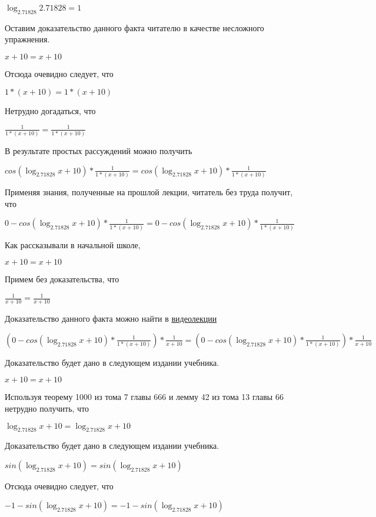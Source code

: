 \documentclass[12pt,a4paper,fleqn]{article}
\theoremstyle{definition}
\begin{document}
$\log_{ 2.71828 }{ 2.71828 } =  1 $

Оставим доказательство данного факта читателю в качестве несложного упражнения. 

$ x  +  10  =  x  +  10 $

Отсюда очевидно следует, что 

$ 1  * ( x  +  10 ) =  1  * ( x  +  10 )$

Нетрудно догадаться, что 

$\frac{ 1 }{ 1  * ( x  +  10 )}
 = \frac{ 1 }{ 1  * ( x  +  10 )}
$

В результате простых рассуждений можно получить 

$cos(\log_{ 2.71828 }{ x  +  10 }) * \frac{ 1 }{ 1  * ( x  +  10 )}
 = cos(\log_{ 2.71828 }{ x  +  10 }) * \frac{ 1 }{ 1  * ( x  +  10 )}
$

Применяя знания, полученные на прошлой лекции, читатель без труда получит, что 

$ 0  - cos(\log_{ 2.71828 }{ x  +  10 }) * \frac{ 1 }{ 1  * ( x  +  10 )}
 =  0  - cos(\log_{ 2.71828 }{ x  +  10 }) * \frac{ 1 }{ 1  * ( x  +  10 )}
$

Как рассказывали в начальной школе, 

$ x  +  10  =  x  +  10 $

Примем без доказательства, что 

$\frac{ 1 }{ x  +  10 }
 = \frac{ 1 }{ x  +  10 }
$

Доказательство данного факта можно найти в \href{https://www.youtube.com/watch?v=dQw4w9WgXcQ}{видеолекции} 

$( 0  - cos(\log_{ 2.71828 }{ x  +  10 }) * \frac{ 1 }{ 1  * ( x  +  10 )}
) * \frac{ 1 }{ x  +  10 }
 = ( 0  - cos(\log_{ 2.71828 }{ x  +  10 }) * \frac{ 1 }{ 1  * ( x  +  10 )}
) * \frac{ 1 }{ x  +  10 }
$

Доказательство будет дано в следующем издании учебника. 

$ x  +  10  =  x  +  10 $

Используя теорему 1000 из тома 7 главы 666 и лемму 42 из тома 13 главы 66 нетрудно получить, что 

$\log_{ 2.71828 }{ x  +  10 } = \log_{ 2.71828 }{ x  +  10 }$

Доказательство будет дано в следующем издании учебника. 

$sin(\log_{ 2.71828 }{ x  +  10 }) = sin(\log_{ 2.71828 }{ x  +  10 })$

Отсюда очевидно следует, что 

$ -1  - sin(\log_{ 2.71828 }{ x  +  10 }) =  -1  - sin(\log_{ 2.71828 }{ x  +  10 })$
\end{document}
